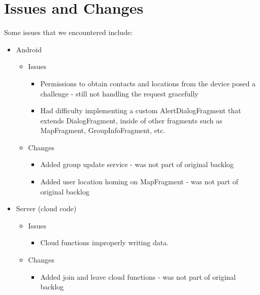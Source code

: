 \documentclass[11pt]{article}
\begin{document}
\section*{Issues and Changes}
Some issues that we encountered include:

	\begin{itemize}
		\item Android
			\begin{itemize}
				\item Issues
				\begin{itemize}
					\item Permissions to obtain contacts and locations from the device posed a challenge - still not handling the request gracefully
					\item Had difficulty implementing a custom AlertDialogFragment that extends DialogFragment, inside of other fragments such as MapFragment, GroupInfoFragment, etc.
				\end{itemize}
				
				\item Changes
				\begin{itemize}
					\item Added group update service - was not part of original backlog		
					\item Added user location homing on MapFragment - was not part of original backlog		
				\end{itemize}
			\end{itemize}
			
		\item Server (cloud code)
		\begin{itemize}
				\item Issues
				\begin{itemize}
					\item Cloud functions improperly writing data.			
				\end{itemize}
				
				\item Changes
				\begin{itemize}
					\item Added join and leave cloud functions - was not part of original backlog
				\end{itemize}
			\end{itemize}
	\end{itemize}
\end{document}
